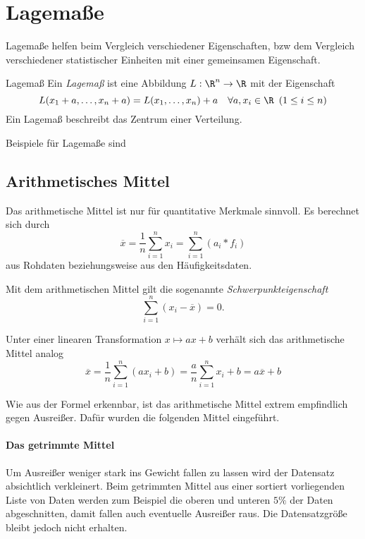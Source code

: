 \section{Lagemaße}
Lagemaße helfen beim Vergleich verschiedener Eigenschaften, bzw dem Vergleich verschiedener statistischer Einheiten mit einer gemeinsamen Eigenschaft. 

\begin{definition}{Lagemaß}
	Ein \emph{Lagemaß} ist eine Abbildung $L:\R^n\rightarrow \R$ mit der Eigenschaft
	\begin{equation*}
		L(x_1+a,\ldots,x_n+a)=L(x_1,\ldots,x_n)+a\quad \forall a,x_i\in\R\enspace (1\leq i\leq n)
	\end{equation*}
	Ein Lagemaß beschreibt das Zentrum einer Verteilung.
\end{definition}

Beispiele für Lagemaße sind

\subsection{Arithmetisches Mittel}
Das arithmetische Mittel ist nur für quantitative Merkmale sinnvoll. Es berechnet sich durch
\begin{equation*}
    \overline x=\frac 1n \sum\limits_{i=1}^n x_i=\sum\limits_{i=1}^n (a_i*f_i)
\end{equation*}
aus Rohdaten beziehungsweise aus den Häufigkeitsdaten.

Mit dem arithmetischen Mittel gilt die sogenannte \emph{Schwerpunkteigenschaft}
\begin{equation*}
	\sum\limits_{i=1}^n(x_i-\overline x)=0.
\end{equation*}

Unter einer linearen Transformation $x\mapsto ax+b$ verhält sich das arithmetische Mittel analog
\begin{equation*}
    \overline x =\frac 1n\sum_{i=1}^n (ax_i+b)=\frac an\sum_{i=1}^n x_i+b=a\overline x +b
\end{equation*}


Wie aus der Formel erkennbar, ist das arithmetische Mittel extrem empfindlich gegen Ausreißer. Dafür wurden die folgenden Mittel eingeführt.

\paragraph{Das getrimmte Mittel}
Um Ausreißer weniger stark ins Gewicht fallen zu lassen wird der Datensatz absichtlich verkleinert. Beim getrimmten Mittel aus einer sortiert vorliegenden Liste von Daten werden zum Beispiel die oberen und unteren $5\%$ der Daten abgeschnitten, damit fallen auch eventuelle Ausreißer raus. Die Datensatzgröße bleibt jedoch nicht erhalten.

